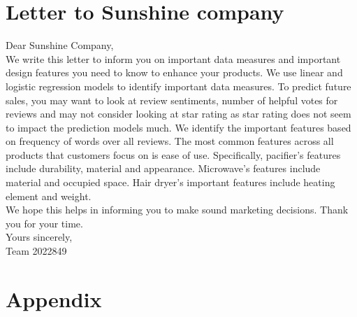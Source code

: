 \documentclass[reqno]{article}
\theoremstyle{definition}
\theoremstyle{definition}
\theoremstyle{remark}
\begin{document}
\section{Letter to Sunshine company}
Dear Sunshine Company,\\
We write this letter to inform you on important data measures and important design features you need to know to enhance your products. We use linear and logistic regression models to identify important data measures. To predict future sales, you may want to look at review sentiments, number of helpful votes for reviews and may not consider looking at star rating as star rating does not seem to impact the prediction models much. We identify the important features based on frequency of words over all reviews. The most common features across all products that customers focus on is ease of use. Specifically, pacifier's features include durability, material and appearance. Microwave's features include material and occupied space. Hair dryer's important features include heating element and weight. \\
We hope this helps in informing you to make sound marketing decisions. Thank you for your time. \\
Yours sincerely,\\
Team 2022849
\section{Appendix}
\end{document}
